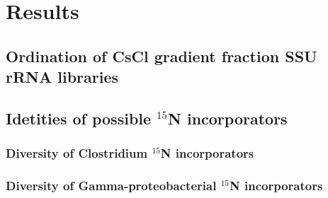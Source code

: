 \section{Results}
\subsection{Ordination of CsCl gradient fraction SSU rRNA libraries}
\subsection{Idetities of possible $^{15}$N incorporators}
\subsubsection{Diversity of Clostridium $^{15}$N incorporators}
\subsubsection{Diversity of Gamma-proteobacterial $^{15}$N incorporators}



